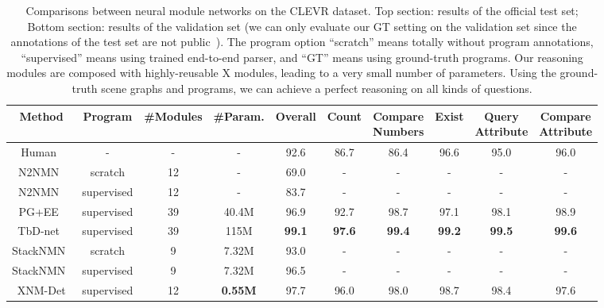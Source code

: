 \documentclass[10pt,twocolumn,letterpaper]{article}
\begin{document}
\begin{table*}[ht]
    \caption{Comparisons between neural module networks on the CLEVR dataset. Top section: results of the official test set; Bottom section: results of the validation set (we can only evaluate our GT setting on the validation set since the annotations of the test set are not public~\cite{johnson2017clevr}). The program option ``scratch'' means totally without program annotations, ``supervised'' means using trained end-to-end parser, and ``GT'' means using ground-truth programs. Our reasoning modules are composed with highly-reusable X modules, leading to a very small number of parameters. Using the ground-truth scene graphs and programs, we can achieve a perfect reasoning on all kinds of questions.}
    \centering
    \small
    \begin{tabular}{|c|c|c|c||c|c|c|c|c|c|}
    \hline
    Method                          & Program & \#Modules & \#Param. & Overall  & Count & \specialcell[c]{Compare\\Numbers} & Exist & \specialcell[c]{Query\\Attribute} & \specialcell[c]{Compare\\Attribute} \\
    \hline
Human~\cite{johnson2017clevr}   &   -          &   -   &   -       &   92.6  & 86.7  &     86.4    &   96.6   &   95.0   &   96.0 \\
    N2NMN~\cite{hu2017learning}     &   scratch    &   12  &   -       &   69.0  & -    & -    & -    & -    & -    \\
    N2NMN~\cite{hu2017learning}     &   supervised  &   12  &   -       &   83.7  & -    & -    & -    & -    & -    \\
    PG+EE~\cite{johnson2017inferring} &   supervised  &   39  &   40.4M   &   96.9  & 92.7 & 98.7 & 97.1 & 98.1 & 98.9 \\
TbD-net~\cite{mascharka2018transparency} & supervised &   39  &   115M    &   \textbf{99.1}  & \textbf{97.6} & \textbf{99.4} & \textbf{99.2} & \textbf{99.5} & \textbf{99.6} \\
    StackNMN~\cite{hu2018explainable} &   scratch  &   9   &   7.32M   &      93.0  & -    & -    & -    & -    & -    \\
    StackNMN~\cite{hu2018explainable} &   supervised  &   9   &   7.32M   &   96.5  & -    & -    & -    & -    & -    \\
    XNM-Det  &   supervised  &   12  &   \textbf{0.55M}   &   97.7 & 96.0 & 98.0 & 98.7 & 98.4 & 97.6 \\

\end{tabular}
\end{table*}
\end{document}
